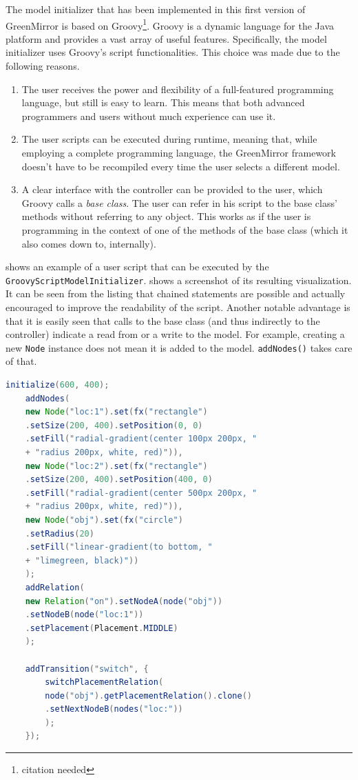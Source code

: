 \documentclass[a4paper]{article}
\begin{document}
	The model initializer that has been implemented in this first version of GreenMirror is based on Groovy\footnote{citation needed}. Groovy is a dynamic language for the Java platform and provides a vast array of useful features. Specifically, the model initializer uses Groovy's script functionalities. This choice was made due to the following reasons.
	\begin{enumerate}
	\item The user receives the power and flexibility of a full-featured programming language, but still is easy to learn. This means that both advanced programmers and users without much experience can use it.
	\item The user scripts can be executed during runtime, meaning that, while employing a complete programming language, the GreenMirror framework doesn't have to be recompiled every time the user selects a different model.
	\item A clear interface with the controller can be provided to the user, which Groovy calls a \emph{base class}. The user can refer in his script to the base class' methods without referring to any object. This works as if the user is programming in the context of one of the methods of the base class (which it also comes down to, internally).
	\end{enumerate}
	 shows an example of a user script that can be executed by the \lstinline{GroovyScriptModelInitializer}.  shows a screenshot of its resulting visualization. It can be seen from the listing that chained statements are possible and actually encouraged to improve the readability of the script. Another notable advantage is that it is easily seen that calls to the base class (and thus indirectly to the controller) indicate a read from or a write to the model. For example, creating a new \lstinline{Node} instance does not mean it is added to the model. \lstinline{addNodes()} takes care of that.
	\begin{lstlisting}[language=java, label={lst:groovyexample}, caption={Example Groovy user script}]
	initialize(600, 400);
	addNodes(
	new Node("loc:1").set(fx("rectangle")
	.setSize(200, 400).setPosition(0, 0)
	.setFill("radial-gradient(center 100px 200px, "
	+ "radius 200px, white, red)")),
	new Node("loc:2").set(fx("rectangle")
	.setSize(200, 400).setPosition(400, 0)
	.setFill("radial-gradient(center 500px 200px, "
	+ "radius 200px, white, red)")),
	new Node("obj").set(fx("circle")
	.setRadius(20)
	.setFill("linear-gradient(to bottom, "
	+ "limegreen, black)"))
	);
	addRelation(
	new Relation("on").setNodeA(node("obj"))
	.setNodeB(node("loc:1"))
	.setPlacement(Placement.MIDDLE)
	);
	
	addTransition("switch", {
		switchPlacementRelation(
		node("obj").getPlacementRelation().clone()
		.setNextNodeB(nodes("loc:"))
		);
	});
	\end{lstlisting}
\end{document}
